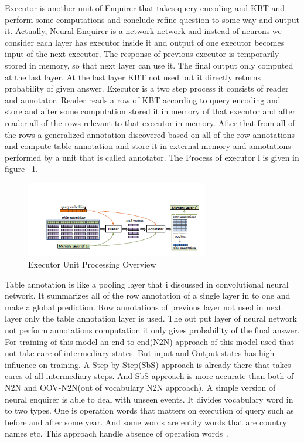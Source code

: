 \documentclass{doublecol-new}
\theoremstyle{TH}{
\newtheorem{lemma}{Lemma}
\newtheorem{theorem}[lemma]{Theorem}
\newtheorem{corrolary}[lemma]{Corrolary}
\newtheorem{conjecture}[lemma]{Conjecture}
\newtheorem{proposition}[lemma]{Proposition}
\newtheorem{claim}[lemma]{Claim}
\newtheorem{stheorem}[lemma]{Wrong Theorem}
\newtheorem{algorithm}{Algorithm}
}
\theoremstyle{THrm}{
\newtheorem{definition}{Definition}[section]
\newtheorem{question}{Question}[section]
\newtheorem{remark}{Remark}
\newtheorem{scheme}{Scheme}
}
\theoremstyle{THhit}{
\newtheorem{case}{Case}[section]
}
\begin{document}
 Executor is another unit of Enquirer that takes query encoding and KBT and perform some computations and conclude refine question to some way and output it. Actually,  Neural Enquirer is a network network and instead of neurons we consider each layer has executor inside it and output of one executor becomes input of the next executor. The response of previous executor is temporarily stored in memory, so that next layer can use it. The final output only computed at the last layer. At the last layer KBT not used but it directly returns probability of given answer. Executor is a two step process it consists of reader and annotator. Reader reads a row of KBT according to query encoding and store and after some computation stored it in memory of that executor and after reader all of the rows relevant to that executor in memory. After that from all of the rows a generalized annotation discovered based on all of the row annotations and compute table annotation and store it in external memory and annotations performed by a unit that is called annotator. The Process of executor l is given in figure ~\ref{fig:executor}. 


\begin{figure}[h]
	\centerline{\includegraphics[width=8cm,keepaspectratio]{image/executor.PNG}}
	\caption{Executor Unit Processing Overview}
	\label{fig:executor}
\end{figure} 

Table annotation is like a pooling layer that i discussed in convolutional neural network. It summarizes all of the row annotation of a single layer in to one and make a global prediction. Row annotations of previous layer not used in next layer only the table annotation layer is used.  The out put layer of neural network not perform annotations computation it only gives probability of the final answer. For training of this model an end to end(N2N) approach of this model used that not take care of intermediary states. But input and Output states has high influence on training. A Step by Step(SbS) approach is already there that takes cares of all intermediary steps. And SbS approach is more accurate than both of N2N and OOV-N2N(out of vocabulary N2N approach). A simple version of neural enquirer is able to deal with unseen events. It divides vocabulary word in to two types. One is operation words that matters on execution of query such as before and after some year. And some words are entity words that are country names etc. This approach handle absence of operation words~\cite{yin2015neural}.  
\end{document}
